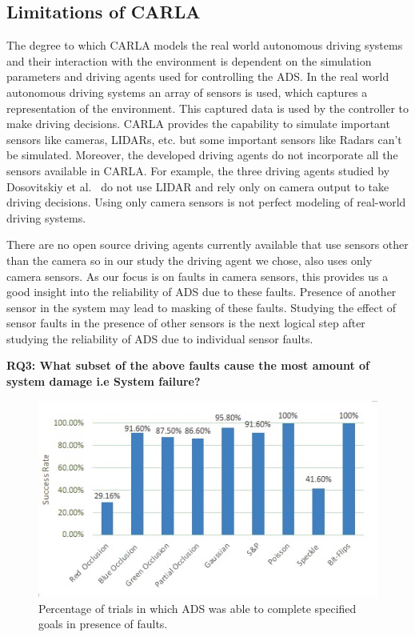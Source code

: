 \subsection{Limitations of CARLA}
The degree to which CARLA models the real world autonomous driving systems and their interaction with the environment is dependent on the simulation parameters and driving agents used for controlling the ADS. In the real world autonomous driving systems an array of sensors is used, which captures a representation of the environment. This captured data is used by the controller to make driving decisions. CARLA provides the capability to simulate important sensors like cameras, LIDARs, etc. but some important sensors like Radars can't be simulated. Moreover, the developed driving agents do not incorporate all the sensors available in CARLA. For example, the three driving agents studied by Dosovitskiy et al.~\cite{Dosovitskiy17} do not use LIDAR and rely only on camera output to take driving decisions. Using only camera sensors is not perfect modeling of real-world driving systems.

There are no open source driving agents currently available that use sensors other than the camera so in our study the driving agent we chose, also uses only camera sensors. As our focus is on faults in camera sensors, this provides us a good insight into the reliability of ADS due to these faults. Presence of another sensor in the system may lead to masking of these faults. Studying the effect of sensor faults in the presence of other sensors is the next logical step after studying the reliability of ADS due to individual sensor faults.

\textbf{RQ3: What subset of the above faults cause the most amount of system damage i.e System failure?}

\begin{figure}
	\vspace{-0.5em}
	\centering
	\includegraphics[scale=0.7]{success_rate}
	\vspace{-0.5em}
	\caption{Percentage of trials in which ADS was able to complete specified goals in presence of faults.}
	\label{fig:success_rate}
	\vspace{-1.5em}
\end{figure}

